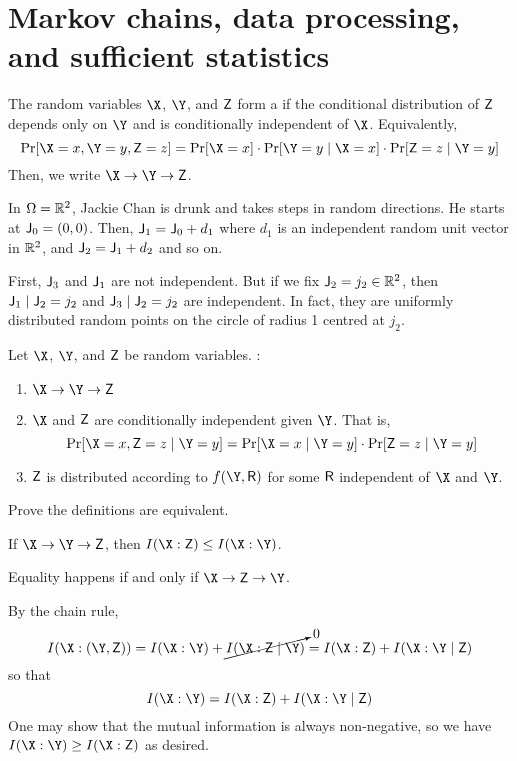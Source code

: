 \documentclass[class=co432,notes,tikz]{agony}
\begin{document}
\section{Markov chains, data processing, and sufficient statistics}
\begin{defn}
  The random variables $\X$, $\Y$, and $\mathsf Z$ form a 
  if the conditional distribution of $\mathsf Z$ depends only on $\Y$
  and is conditionally independent of $\X$. Equivalently,
  \[ \Pr[\X=x,\Y=y,\rv Z=z] = \Pr[\X=x]\cdot\Pr[\Y=y\mid\X=x]\cdot\Pr[\rv Z=z\mid\Y=y] \]
  Then, we write $\X \to \Y \to \rv Z$.
\end{defn}

\begin{example}
  In $\Omega = \mathbb{R}^2$, Jackie Chan is drunk and takes steps in random directions.
  He starts at $\mathsf J_0 = (0,0)$.
  Then, $\mathsf J_1 = \mathsf J_0 + d_1$ where $d_1$ is an independent random unit vector in $\mathbb{R}^2$,
  and $\mathsf J_2 = \mathsf J_1 + d_2$ and so on.
\end{example}

First, $\mathsf J_3$ and $\mathsf J_1$ are not independent.
But if we fix $\mathsf J_2 = j_2 \in \mathbb{R}^2$, then $\mathsf J_1 \mid \mathsf J_2=j_2$
and $\mathsf J_3 \mid \mathsf J_2=j_2$ are independent.
In fact, they are uniformly distributed random points on the circle of radius 1
centred at $j_2$.

\begin{prop}
  Let $\X$, $\Y$, and $\mathsf Z$ be random variables. \TFAE:
  \begin{enumerate}
    \item $\X \to \Y \to \rv Z$
    \item $\X$ and $\mathsf Z$ are conditionally independent given $\Y$.
          That is,
          \[
            \Pr[\X=x,\rv Z=z \mid \Y=y] = \Pr[\X=x \mid \Y=y] \cdot \Pr[\rv Z=z \mid \Y=y]
          \]
    \item $\mathsf Z$ is distributed according to $f(\Y,\rv R)$ for some $\mathsf R$ independent of $\X$ and $\Y$.
  \end{enumerate}
\end{prop}
\begin{xca}
  Prove the definitions are equivalent.
\end{xca}

\begin{theorem}\label{thm:dpi}
  If $\X \to \Y \to \rv Z$, then $I(\X : \rv Z) \leq I(\X : \Y)$.

  Equality happens if and only if $\X \to \rv Z \to \Y$.
\end{theorem}
\begin{prf}
  By the chain rule,
  \[
    I(\X : (\Y, \rv Z)) = I(\X : \Y) + \cancelto{0}{I(\X : \rv Z \mid \Y)}
    = I(\X : \rv Z) + I(\X : \Y \mid \rv Z)
  \]
  so that
  \[ I(\X : \Y) = I(\X : \rv Z) + I(\X : \Y \mid \rv Z) \]
  One may show that the mutual information is always non-negative,
  so we have $I(\X : \Y) \geq I(\X : \rv Z)$ as desired.
\end{prf}
\end{document}
